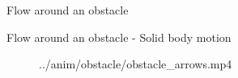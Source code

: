 \documentclass{beamer}  %
\begin{document}
\begin{frame}{Flow around an obstacle}
    \begin{figure}
        \begin{overprint}
        \end{overprint}
    \end{figure}
\end{frame}

\begin{frame}{Flow around an obstacle - Solid body motion}
    \begin{figure}
        \centering
        \movie[width=0.725\textheight, height=0.75\textheight, autostart, loop]{} {../anim/obstacle/obstacle_arrows.mp4}
    \end{figure}
\end{frame}

\end{document}
